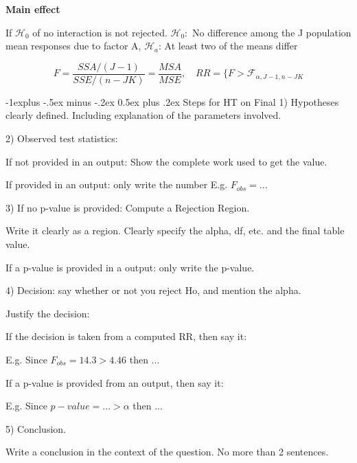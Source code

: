 \documentclass[8pt,landscape]{extarticle}
\makeatletter
\renewcommand{\subsection}{\@startsection{subsection}{2}{0mm}%
                                {-1explus -.5ex minus -.2ex}%
                                {0.5ex plus .2ex}%
                                {\normalfont\normalsize\bfseries}}
\makeatother
\begin{document}
\begin{multicols}{3}
\textbf{Main effect}

If $\mathcal{H}_0$ of no interaction is not rejected. $\mathcal{H}_0 :$ No difference among the J population mean responses due to factor A, 
$\mathcal{H}_a$: At least two of the means differ

$$F = \frac{SSA/(J-1) }{SSE/(n-JK)} = \frac{MSA}{MSE}, \quad RR = \{ F > \mathcal{F}_{\alpha ,J-1, n-JK} $$

\subsection{Steps for HT on Final}
1) Hypotheses clearly defined. Including explanation of the parameters involved. 

2) Observed test statistics: 

If not provided in an output: Show the complete work used to get the value.

If provided in an output: only write the number E.g. $F_{obs}=...$

3) If no p-value is provided: Compute a Rejection Region.

Write it clearly as a region. Clearly specify the alpha, df, etc. and the final table value.

If a p-value is provided in a output: only write the p-value.

4) Decision: say whether or not you reject Ho, and mention the alpha.

Justify the decision:

If the decision is taken from a computed RR, then say it:

E.g. Since $F_{obs}=14.3 > 4.46$ then ...

If a p-value is provided from an output, then say it:

E.g. Since $p-value=...>\alpha$ then ... 

5) Conclusion. 

Write a conclusion in the context of the question. No more than 2 sentences. 



\end{multicols}
\end{document}

